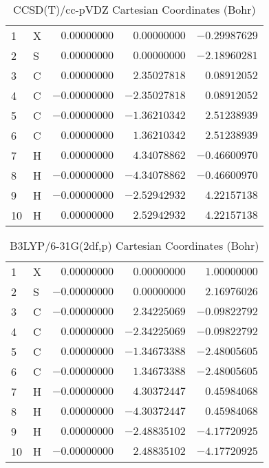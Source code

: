\documentclass[10pt,oneside]{article}
\begin{document}
\begin{table}[h!]
\centering
\caption{CCSD(T)/cc-pVDZ Cartesian Coordinates (Bohr)}
\begin{tabular}{llrrr}
1  & X  & $ 0.00000000$ & $ 0.00000000$ & $-0.29987629$ \\
2  & S  & $ 0.00000000$ & $ 0.00000000$ & $-2.18960281$ \\
3  & C  & $ 0.00000000$ & $ 2.35027818$ & $ 0.08912052$ \\
4  & C  & $-0.00000000$ & $-2.35027818$ & $ 0.08912052$ \\
5  & C  & $-0.00000000$ & $-1.36210342$ & $ 2.51238939$ \\
6  & C  & $ 0.00000000$ & $ 1.36210342$ & $ 2.51238939$ \\
7  & H  & $ 0.00000000$ & $ 4.34078862$ & $-0.46600970$ \\
8  & H  & $-0.00000000$ & $-4.34078862$ & $-0.46600970$ \\
9  & H  & $-0.00000000$ & $-2.52942932$ & $ 4.22157138$ \\
10 & H  & $ 0.00000000$ & $ 2.52942932$ & $ 4.22157138$ \\
\end{tabular}
\end{table}

\begin{table}[h!]
\centering
\caption{B3LYP/6-31G(2df,p) Cartesian Coordinates (Bohr)}
\begin{tabular}{llrrr}
1  & X  & $ 0.00000000$ & $ 0.00000000$ & $ 1.00000000$ \\
2  & S  & $-0.00000000$ & $ 0.00000000$ & $ 2.16976026$ \\
3  & C  & $-0.00000000$ & $ 2.34225069$ & $-0.09822792$ \\
4  & C  & $ 0.00000000$ & $-2.34225069$ & $-0.09822792$ \\
5  & C  & $ 0.00000000$ & $-1.34673388$ & $-2.48005605$ \\
6  & C  & $-0.00000000$ & $ 1.34673388$ & $-2.48005605$ \\
7  & H  & $-0.00000000$ & $ 4.30372447$ & $ 0.45984068$ \\
8  & H  & $ 0.00000000$ & $-4.30372447$ & $ 0.45984068$ \\
9  & H  & $ 0.00000000$ & $-2.48835102$ & $-4.17720925$ \\
10 & H  & $-0.00000000$ & $ 2.48835102$ & $-4.17720925$ \\
\end{tabular}
\end{table}
\end{document}
